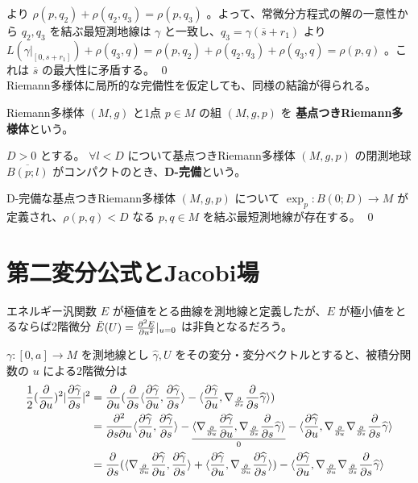 \documentclass[dvipdfmx,a4paper]{jsreport}
\theoremstyle{definition}
\newcommand{\der}{\partial}
\renewcommand{\bar}{\overline}
\renewcommand{\hat}{\widehat}
\begin{document}
より $\rho(p,q_2)+\rho(q_2,q_3)=\rho(p,q_3)$ 。よって、常微分方程式の解の一意性から $q_2,q_3$ を結ぶ最短測地線は $\gamma$ と一致し、$q_3=\gamma(\bar{s}+r_1)$ より $L(\gamma|_[0,s+r_1])+\rho(q_3,q)=\rho(p,q_2)+\rho(q_2,q_3)+\rho(q_3,q)=\rho(p,q)$ 。これは $\bar{s}$ の最大性に矛盾する。 \qed \\


Riemann多様体に局所的な完備性を仮定しても、同様の結論が得られる。

 Riemann多様体 $(M,g)$ と1点 $p \in M$ の組 $(M,g,p)$ を \textbf{基点つきRiemann多様体}という。

 $D>0$ とする。 $\forall l<D$ について基点つきRiemann多様体 $(M,g,p)$ の閉測地球 $\overline{B(p;l)}$ がコンパクトのとき、\textbf{D-完備}という。

\thm D-完備な基点つきRiemann多様体 $(M,g,p)$ について $\exp_p:B(0;D)\to M$ が定義され、$\rho(p,q)<D$ なる $p,q \in M$ を結ぶ最短測地線が存在する。 \qed
 


\section{第二変分公式とJacobi場}
エネルギー汎関数 $E$ が極値をとる曲線を測地線と定義したが、$E$ が極小値をとるならば2階微分 $\ddot{E}(U)={\der^2 E \over \der u^2}|_{u=0}$ は非負となるだろう。

$\gamma:[0,a] \to M$ を測地線とし $\hat{\gamma},U$ をその変分・変分ベクトルとすると、被積分関数の $u$ による2階微分は
\begin{align*}
    {1 \over 2}({\der \over \der u})^2|{\der \hat{\gamma} \over \der s}|^2 &= {\der \over \der u}({\der \over \der s} \langle {\der\hat{\gamma} \over \der u},{\der\hat{\gamma} \over \der s} \rangle-\langle {\der \hat{\gamma} \over \der u},\nabla_{\der \over \der s}{\der \over \der s}\hat{\gamma} \rangle) \\
    &= {\der^2\over \der s \der u} \langle {\der\hat{\gamma} \over \der u},{\der\hat{\gamma} \over \der s} \rangle
    -\underset{0}{\underline{\langle \nabla_{\der \over \der u}{\der \hat{\gamma} \over \der u},\nabla_{\der \over \der s}{\der \over \der s}\hat{\gamma} \rangle}}
    -\langle {\der \hat{\gamma} \over \der u},\nabla_{\der \over \der u} \nabla_{\der \over \der s}{\der \over \der s}\hat{\gamma} \rangle \\
    &= {\der \over \der s}(\langle \nabla_{\der \over \der u}{\der\hat{\gamma} \over \der u},{\der\hat{\gamma} \over \der s} \rangle
    +\langle {\der\hat{\gamma} \over \der u},\nabla_{\der \over \der u}{\der\hat{\gamma} \over \der s} \rangle)
    -\langle {\der \hat{\gamma} \over \der u},\nabla_{\der \over \der u} \nabla_{\der \over \der s}{\der \over \der s}\hat{\gamma} \rangle
\end{align*}
\end{document}
